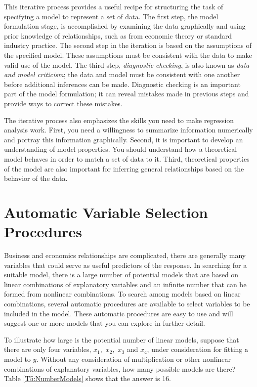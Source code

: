 \newpage



This iterative process provides a useful recipe for structuring the
task of specifying a model to represent a set of data. The first
step, the model formulation stage, is accomplished by examining the
data graphically and using prior knowledge of relationships, such as
from economic theory or standard industry practice. The second step
in the iteration is based on the assumptions of the specified model.
These assumptions must be consistent with the data to make valid use
of the model. The third step, \emph{diagnostic checking}, is also
known as \emph{data and model criticism}; the data and model must be
consistent with one another before additional inferences can be
made. Diagnostic checking is an important part of the model
formulation; it can reveal mistakes made in previous steps and
provide ways to correct these mistakes.

The iterative process also emphasizes the skills you need to make
regression analysis work. First, you need a willingness to summarize
information numerically and portray this information graphically.
Second, it is important to develop an understanding of model
properties. You should understand how a theoretical model behaves in
order to match a set of data to it. Third, theoretical properties of
the model are also important for inferring general relationships
based on the behavior of the data.


\section{Automatic Variable Selection
Procedures}\label{S5:Automatic}

Business and economics relationships are complicated, there are
generally many variables that could serve as useful predictors of
the response. In searching for a suitable model, there is a large
number of potential models that are based on linear combinations of
explanatory variables and an infinite number that can be formed from
nonlinear combinations. To search among models based on linear
combinations, several automatic procedures are available to select
variables to be included in the model. These automatic procedures
are easy to use and will suggest one or more models that you can
explore in further detail.

To illustrate how large is the potential number of linear models,
suppose that there are only four variables, $x_{1},$ $x_2,$ $x_3$
and $x_4$, under consideration for fitting a model to $y$. Without
any consideration of multiplication or other nonlinear combinations
of explanatory variables, how many possible models are there? Table
\ref{T5:NumberModels} shows that the answer is 16.

